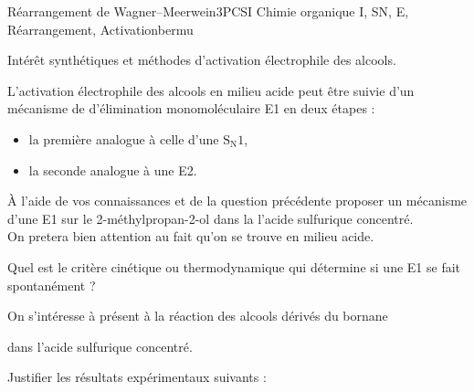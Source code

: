 
\begin{exercise}{Réarrangement de Wagner--Meerwein}{3}{PCSI}
{Chimie organique I, SN, E, Réarrangement, Activation}{bermu}

\begin{questions}
\questioncours Intérêt synthétiques et méthodes d'activation électrophile des alcools.

\begin{EnvUplevel}
    L'activation électrophile des alcools en milieu acide peut être suivie d'un mécanisme de d'élimination monomoléculaire E1 en deux étapes :
    \begin{itemize}
        \item la première analogue à celle d'une $\mathrm{S_N1}$,
        \item la seconde analogue à une E2.
    \end{itemize}
\end{EnvUplevel}

\question \`A l'aide de vos connaissances et de la question précédente proposer un mécanisme d'une E1 sur le 2-méthylpropan-2-ol dans la l'acide sulfurique concentré. \\
On pretera bien attention au fait qu'on se trouve en milieu acide.

\question Quel est le critère cinétique ou thermodynamique qui détermine si une E1 se fait spontanément ?

\begin{EnvUplevel}
    On s'intéresse à présent à la réaction des alcools dérivés du bornane
    \begin{center}
    \end{center}
    dans l'acide sulfurique concentré.
\end{EnvUplevel}


\question Justifier les résultats expérimentaux suivants :
\end{questions}
\end{exercise}
